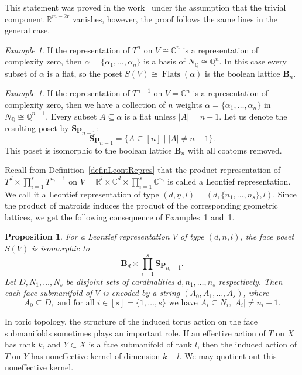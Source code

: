\documentclass[english,12pt,oneside]{amsproc}
\DeclareMathOperator{\Flats}{Flats}
\newcommand{\Ro}{\mathbb{R}}
\newcommand{\Co}{\mathbb{C}}
\newcommand{\Qo}{\mathbb{Q}}
\newcommand{\B}{\mathbf{B}}
\newcommand{\Sp}{\mathbf{Sp}}
\newcommand{\Nq}{N_\Qo}
\newcounter{stmcounter}[section]
\numberwithin{equation}{section}
\theoremstyle{plain}
\newtheorem{prop}[stmcounter]{Proposition}
\theoremstyle{definition}
\theoremstyle{remark}
\newtheorem{ex}[stmcounter]{Example}
\begin{document}
This statement was proved in the work~\cite{AyzCherep} under the assumption that the trivial component $\Ro^{m-2r}$ vanishes, however, the proof follows the same lines in the general case.

\begin{ex}\label{exCompl0Lattice}
If the representation of $T^n$ on $V\cong\Co^n$ is a representation of complexity zero, then $\alpha=\{\alpha_1,\ldots,\alpha_n\}$ is a basis of $\Nq\cong\Qo^n$. In this case every subset of $\alpha$ is a flat, so the poset $S(V)\cong\Flats(\alpha)$ is the boolean lattice $\B_n$.
\end{ex}

\begin{ex}\label{exCompl1Lattice}
If the representation of $T^{n-1}$ on $V=\Co^n$ is a representation of complexity zero, then we have a collection of $n$ weights $\alpha=\{\alpha_1,\ldots,\alpha_n\}$ in $\Nq\cong\Qo^{n-1}$. Every subset $A\subseteq\alpha$ is a flat unless $|A|= n-1$. Let us denote the resulting poset by $\Sp_{n-1}$:
\[
\Sp_{n-1}=\{A\subseteq[n]\mid |A|\neq n-1\}.
\]
This poset is isomorphic to the boolean lattice $\B_n$ with all coatoms removed.
\end{ex}

Recall from Definition~\ref{definLeontRepres} that the product representation of $T^d\times\prod_{i=1}^{s}T^{n_i-1}$ on $V=\Ro^l\times\Co^d\times\prod_{i=1}^{s}\Co^{n_i}$ is called a Leontief representation. We call it a Leontief representation of type $(d,\underline{n},l)=(d,\{n_1,\ldots,n_s\},l)$. Since the product of matroids induces the product of the corresponding geometric lattices, we get the following consequence of Examples~\ref{exCompl0Lattice} and~\ref{exCompl1Lattice}.

\begin{prop}\label{propFacePosetLeontief}
For a Leontief representation $V$ of type $(d,\underline{n},l)$, the face poset $S(V)$ is isomorphic to
\[
\B_d\times\prod_{i=1}^s\Sp_{n_i-1}.
\]
Let $D, N_1,\ldots,N_s$ be disjoint sets of cardinalities $d,n_1,\ldots,n_s$ respectively. Then each face submanifold of $V$ is encoded by a string $(A_0,A_1,\ldots,A_s)$, where
\[
A_0\subseteq D, \text{ and for all } i\in[s]=\{1,\ldots,s\} \text{ we have } A_i\subseteq N_i, |A_i|\neq n_i-1.
\]
\end{prop}

In toric topology, the structure of the induced torus action on the face submanifolds sometimes plays an important role. If an effective action of $T$ on $X$ has rank $k$, and $Y\subset X$ is a face submanifold of rank $l$, then the induced action of $T$ on $Y$ has noneffective kernel of dimension $k-l$. We may quotient out this noneffective kernel.
\end{document}
